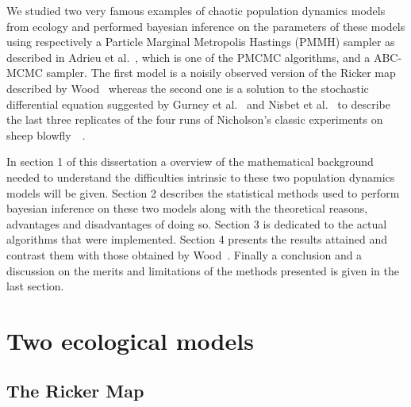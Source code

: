 \documentclass{article}
\begin{document}
	We studied two very famous examples of chaotic population dynamics models from ecology and performed bayesian inference on the parameters of these models using respectively a Particle Marginal Metropolis Hastings (PMMH) sampler as described in Adrieu et al.~\cite{andrieu2010particle}, which is one of the PMCMC algorithms, and a ABC-MCMC sampler. The first model is a noisily observed version of the Ricker map described by Wood~\cite{wood2010statistical} whereas the second one is a solution to the stochastic differential equation suggested by Gurney et al.~\cite{gurney1980nicholson} and Nisbet et al.~\cite{nisbet1982modelling} to describe the last three replicates of the four runs of Nicholson’s classic experiments on sheep blowfly~\cite{nicholson1954outline}~\cite{nicholson1957self}.
	
	In section 1 of this dissertation a overview of the mathematical background needed to understand the difficulties intrinsic to these two population dynamics models will be given. Section 2 describes the statistical methods used to perform bayesian inference on these two models along with the theoretical reasons, advantages and disadvantages of doing so. Section 3 is dedicated to the actual algorithms that were implemented. Section 4 presents the results attained and contrast them with those obtained by Wood~\cite{wood2010statistical}. Finally a conclusion and a discussion on the merits and limitations of the methods presented is given in the last section.
	
	\section{Two ecological models}
	\subsection{The Ricker Map} 
\end{document}

